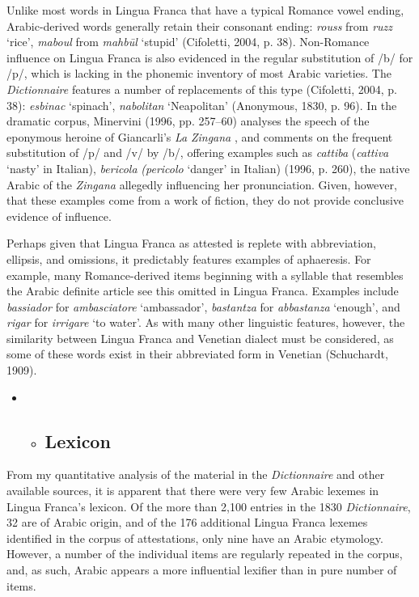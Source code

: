 \documentclass[output=paper]{langsci/langscibook}
\begin{document}
Unlike most words in Lingua Franca that have a typical Romance vowel ending, Arabic-derived words generally retain their consonant ending: \textit{rouss} from \textit{ruzz} ‘rice’, \textit{maboul} from \textit{mahbūl} ‘stupid’ (Cifoletti, 2004, p. 38). Non-Romance influence on Lingua Franca is also evidenced in the regular substitution of /b/ for /p/, which is lacking in the phonemic inventory of most Arabic varieties. The \textit{Dictionnaire} features a number of replacements of this type (Cifoletti, 2004, p. 38): \textit{esbinac} ‘spinach’, \textit{nabolitan} ‘Neapolitan’ (Anonymous, 1830, p. 96). In the dramatic corpus, Minervini (1996, pp. 257–60) analyses the speech of the eponymous heroine of Giancarli’s \textit{La} \textit{Zingana} , and comments on the frequent substitution of /p/ and /v/ by /b/, offering examples such as \textit{cattiba} (\textit{cattiva} ‘nasty’ in Italian), \textit{bericola} \textit{(pericolo} ‘danger’ in Italian)  (1996, p. 260), the native Arabic of the \textit{Zingana} allegedly influencing her pronunciation. Given, however, that these examples come from a work of fiction, they do not provide conclusive evidence of influence. 

Perhaps given that Lingua Franca as attested is replete with abbreviation, ellipsis, and omissions, it predictably features examples of aphaeresis. For example, many Romance-derived items beginning with a syllable that resembles the Arabic definite article see this omitted in Lingua Franca. Examples include \textit{bassiador} for \textit{ambasciatore} ‘ambassador’, \textit{bastantza} for \textit{abbastanza} ‘enough’, and \textit{rigar} for \textit{irrigare} ‘to water’. As with many other linguistic features, however, the similarity between Lingua Franca and Venetian dialect must be considered, as some of these words exist in their abbreviated form in Venetian (Schuchardt, 1909).

\begin{itemize}
	\item \begin{itemize}
		\item \subsection{Lexicon}
	\end{itemize}
\end{itemize}

From my quantitative analysis of the material in the \textit{Dictionnaire} and other available sources, it is apparent that there were very few Arabic lexemes in Lingua Franca’s lexicon. Of the more than 2,100 entries in the 1830 \textit{Dictionnaire}, 32 are of Arabic origin, and of the 176 additional Lingua Franca lexemes identified in the corpus of attestations, only nine have an Arabic etymology. However, a number of the individual items are regularly repeated in the corpus, and, as such, Arabic appears a more influential lexifier than in pure number of items.
\end{document}
